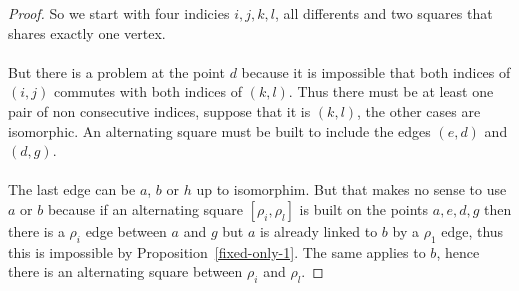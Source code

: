 \begin{proof}
  So we start with four indicies $i, j, k, l$, all differents and two squares that shares exactly one vertex.

  \begin{figure}[H]
    \begin{center}
      \caption{}
    \end{center}
  \end{figure}

  \paragraph{}
  But there is a problem at the point $d$ because it is impossible that both indices of $(i,j)$ commutes with both indices of $(k,l)$. Thus there must be at least one pair of non consecutive indices, suppose that it is $(k,l)$, the other cases are isomorphic. An alternating square must be built to include the edges $(e,d)$ and $(d,g)$.

  \paragraph{}
  The last edge can be $a$, $b$ or $h$ up to isomorphim. But that makes no sense to use $a$ or $b$ because if an alternating square $[\rho_i, \rho_l]$ is built on the points $a,e,d,g$ then there is a $\rho_i$ edge between $a$ and $g$ but $a$ is already linked to $b$ by a $\rho_1$ edge, thus this is impossible by Proposition~\ref{fixed-only-1}. The same applies to $b$, hence there is an alternating square between $\rho_i$ and $\rho_l$.


\end{proof}
